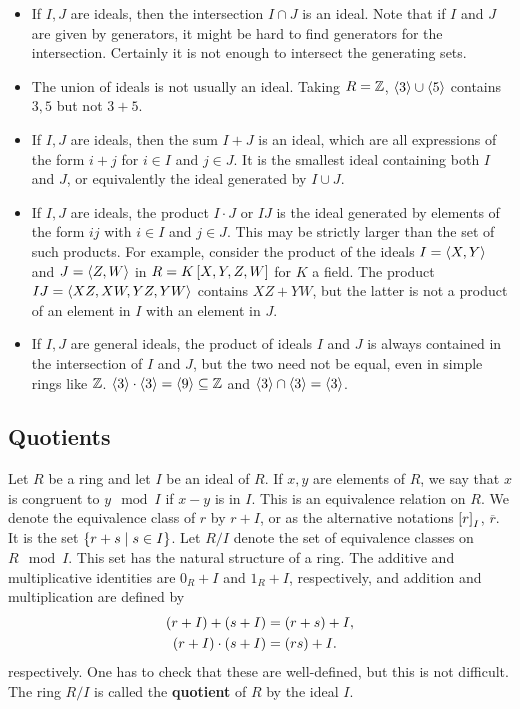 \begin{example*}
\hfill
\begin{itemize}
\item If $ I, J $ are ideals, then the intersection $ I \cap J $ is an ideal. Note that if $ I $ and $ J $ are given by generators, it might be hard to find generators for the intersection. Certainly it is not enough to intersect the generating sets.
\item The union of ideals is not usually an ideal. Taking $ R = \Z $, $ \ab{3} \cup \ab{5} $ contains $ 3, 5 $ but not $ 3 + 5 $.
\item If $ I, J $ are ideals, then the sum $ I + J $ is an ideal, which are all expressions of the form $ i + j $ for $ i \in I $ and $ j \in J $. It is the smallest ideal containing both $ I $ and $ J $, or equivalently the ideal generated by $ I \cup J $.
\item If $ I, J $ are ideals, the product $ I \cdot J $ or $ IJ $ is the ideal generated by elements of the form $ ij $ with $ i \in I $ and $ j \in J $. This may be strictly larger than the set of such products. For example, consider the product of the ideals $ I = \ab{X, Y} $ and $ J = \ab{Z, W} $ in $ R = K\sb{X, Y, Z, W} $ for $ K $ a field. The product $ IJ = \ab{XZ, XW, YZ, YW} $ contains $ XZ + YW $, but the latter is not a product of an element in $ I $ with an element in $ J $.
\item If $ I, J $ are general ideals, the product of ideals $ I $ and $ J $ is always contained in the intersection of $ I $ and $ J $, but the two need not be equal, even in simple rings like $ \Z $. $ \ab{3} \cdot \ab{3} = \ab{9} \subseteq \Z $ and $ \ab{3} \cap \ab{3} = \ab{3} $.
\end{itemize}
\end{example*}

\subsection{Quotients}

Let $ R $ be a ring and let $ I $ be an ideal of $ R $. If $ x, y $ are elements of $ R $, we say that $ x $ is congruent to $ y \mod I $ if $ x - y $ is in $ I $. This is an equivalence relation on $ R $. We denote the equivalence class of $ r $ by $ r + I $, or as the alternative notations $ \sb{r}_I $, $ \overline{r} $. It is the set $ \cb{r + s \mid s \in I} $. Let $ R / I $ denote the set of equivalence classes on $ R \mod I $. This set has the natural structure of a ring. The additive and multiplicative identities are $ 0_R + I $ and $ 1_R + I $, respectively, and addition and multiplication are defined by
\begin{align*}
\rb{r + I} + \rb{s + I} & = \rb{r + s} + I, \\
\rb{r + I} \cdot \rb{s + I} & = \rb{rs} + I.
\end{align*}
respectively. One has to check that these are well-defined, but this is not difficult. The ring $ R / I $ is called the \textbf{quotient} of $ R $ by the ideal $ I $.

